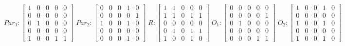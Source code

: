      $$
        Par_{1} : \begin{bmatrix}
            1 & 0 & 0 & 0 & 0 \\
            0 & 0 & 0 & 0 & 0 \\
            0 & 1 & 0 & 0 & 0 \\
			0 & 0 & 0 & 0 & 0 \\
            1 & 0 & 0 & 1 & 1 
        \end{bmatrix}
        \;
        Par_{2} : \begin{bmatrix}
            0 & 0 & 0 & 1 & 0 \\
            0 & 0 & 0 & 0 & 1 \\
            1 & 0 & 0 & 1 & 0 \\
            0 & 0 & 0 & 0 & 0 \\
            0 & 0 & 0 & 1 & 0
        \end{bmatrix}
        \;
        R : \begin{bmatrix}
            1 & 1 & 0 & 0 & 0 \\
            1 & 1 & 0 & 1 & 1 \\
            0 & 0 & 0 & 0 & 0 \\
            0 & 1 & 0 & 1 & 1 \\
            1 & 0 & 0 & 1 & 0
        \end{bmatrix}
        \;
        O_{1} : \begin{bmatrix}
            0 & 0 & 0 & 0 & 0 \\
            0 & 0 & 0 & 0 & 1 \\
            0 & 1 & 0 & 0 & 0 \\
            0 & 0 & 0 & 0 & 0 \\
            0 & 0 & 0 & 1 & 1
        \end{bmatrix}
        \;
        O_{2} : \begin{bmatrix}
            1 & 0 & 0 & 1 & 0 \\
            0 & 0 & 0 & 0 & 0 \\
            1 & 0 & 0 & 1 & 0 \\
            0 & 0 & 0 & 0 & 0 \\
            1 & 0 & 0 & 1 & 0
        \end{bmatrix}
    $$ 

